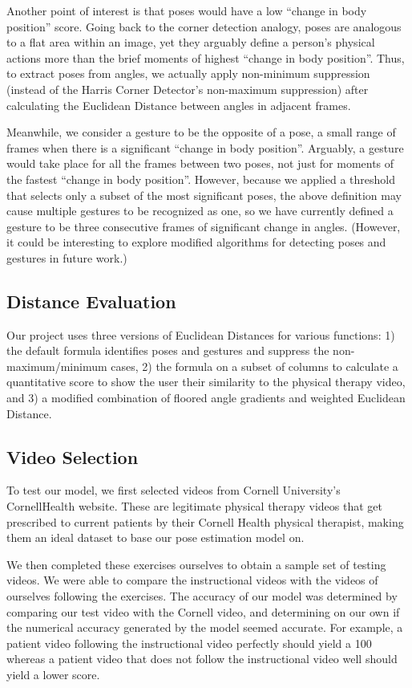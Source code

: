 \indent Another point of interest is that poses would have a low “change in body position” score. Going back to the 
corner detection analogy, poses are analogous to a flat area within an  image, yet they arguably define a 
person’s physical actions more than the brief moments of highest “change in body position”. Thus, to extract 
poses from angles, we actually apply non-minimum suppression (instead of the Harris Corner Detector’s 
non-maximum suppression) after calculating the Euclidean Distance between angles in adjacent frames.

\indent Meanwhile, we consider a gesture to be the opposite of a pose, a small range of frames when there is a 
significant “change in body position”. Arguably, a gesture would take place for all the frames between 
two poses, not just for moments of the fastest “change in body position”. However, because we applied a 
threshold that selects only a subset of the most significant poses, the above definition may cause multiple 
gestures to be recognized as one, so we have currently defined a gesture to be three consecutive frames of 
significant change in angles. (However, it could be interesting to explore modified algorithms for detecting 
poses and gestures in future work.)

\subsection{Distance Evaluation}
\indent Our project uses three versions of Euclidean Distances for 
various functions: 1) the default formula identifies poses and gestures 
and suppress the non-maximum/minimum cases, 2) the formula on a subset 
of columns to calculate a quantitative score to show the user their 
similarity to the physical therapy video, and 3) a modified combination 
of floored angle gradients and weighted Euclidean Distance. 

\subsection{Video Selection}
\indent To test our model, we first selected videos from Cornell 
University’s CornellHealth website\cite{Alpher11}. These are legitimate 
physical therapy videos that get prescribed to current patients by their 
Cornell Health physical therapist, making them an ideal dataset to base 
our pose estimation model on.

\indent We then completed these exercises ourselves to obtain a sample 
set of testing videos. We were able to compare the instructional videos 
with the videos of ourselves following the exercises. The accuracy of 
our model was determined by comparing our test video with the Cornell 
video, and determining on our own if the numerical accuracy generated 
by the model seemed accurate. For example, a patient video following 
the instructional video perfectly should yield a 100%
whereas a patient video that does not follow the instructional video 
well should yield a lower score.
